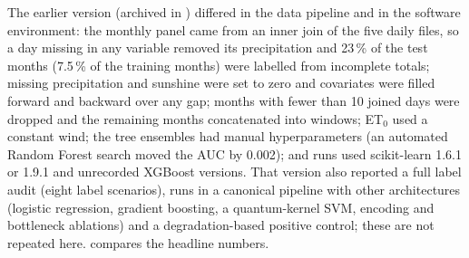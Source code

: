 \documentclass[11pt,a4paper]{article}
\begin{document}
The earlier version (archived in ) differed in the data pipeline and in the software environment: the monthly panel came from an inner join of the five daily files, so a day missing in any variable removed its precipitation and 23\,\% of the test months (7.5\,\% of the training months) were labelled from incomplete totals; missing precipitation and sunshine were set to zero and covariates were filled forward and backward over any gap; months with fewer than 10 joined days were dropped and the remaining months concatenated into windows; ET$_0$ used a constant wind; the tree ensembles had manual hyperparameters (an automated Random Forest search moved the AUC by 0.002); and runs used scikit-learn 1.6.1 or 1.9.1 and unrecorded XGBoost versions. That version also reported a full label audit (eight label scenarios), runs in a canonical pipeline with other architectures (logistic regression, gradient boosting, a quantum-kernel SVM, encoding and bottleneck ablations) and a degradation-based positive control; these are not repeated here.  compares the headline numbers.
\end{document}
